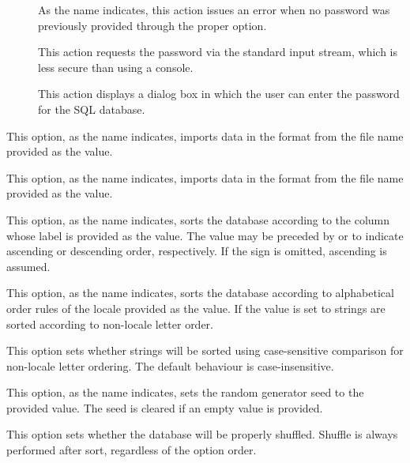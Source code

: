 \begin{description}
\begin{description}
\begin{description}
\item[] As the name indicates, this action issues an error when no password was previously provided through the proper option.

\item[] This action requests the password via the standard input stream, which is less secure than using a console.

\item[] This action displays a dialog box in which the user can enter the password for the \gls{SQL} database.
\end{description}

\item[\abox{probsoln}] This option, as the name indicates, imports data in the  format from the file name provided as the value.

\item[\abox{input}] This option, as the name indicates, imports data in the  format from the file name provided as the value.

\item[\abox{sort}] This option, as the name indicates, sorts the database according to the column whose label is provided as the value. The value may be preceded by \rbox{+} or \rbox{-} to indicate ascending or descending order, respectively. If the sign is omitted, ascending is assumed.

\item[\abox{sortlocale}] This option, as the name indicates, sorts the database according to alphabetical order rules of the locale provided as the value. If the value is set to  strings are sorted according to non-locale letter order.

\item[\rpsbox{sortcase}] This option sets whether strings will be sorted using case-sensitive comparison for non-locale letter ordering. The default behaviour is case-insensitive.

\item[\abox{seed}] This option, as the name indicates, sets the random generator seed to the provided value. The seed is cleared if an empty value is provided.

\item[\rpsbox{shuffle}] This option sets whether the database will be properly shuffled. Shuffle is always performed after sort, regardless of the option order.


\end{description}
\end{description}
